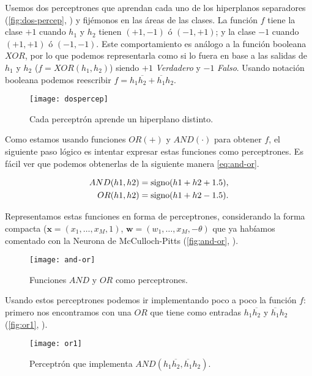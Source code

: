 Usemos dos perceptrones que aprendan cada uno de los hiperplanos separadores (\autoref{fig:dos-percep}, \cite{abu2012learning}) y fijémonos en las áreas de las clases. La función $f$ tiene la clase $+1$ cuando $h_1$ y $h_2$ tienen $(+1, -1)$ ó $(-1, +1)$; y la clase $-1$ cuando $(+1, +1)$ ó $(-1, -1)$. Este comportamiento es análogo a la función booleana $XOR$, por lo que podemos representarla como si lo fuera en base a las salidas de $h_1$ y $h_2$ ($f = XOR(h_1, h_2)$) siendo $+1$ \emph{Verdadero} y $-1$ \emph{Falso}. Usando notación booleana podemos reescribir $f = h_1\overline{h_2} + \overline{h_1}h_2$.

\begin{figure}[htpb]
  \centering
  \texttt{[image: dospercep]}
  \caption{Cada perceptrón aprende un hiperplano distinto.}
  \label{fig:dos-percep}
\end{figure}

Como estamos usando funciones $OR (+)$ y $AND (\cdot)$ para obtener $f$, el siguiente paso lógico es intentar expresar estas funciones como perceptrones. Es fácil ver que podemos obtenerlas de la siguiente manera \eqref{eq:and-or}.

\begin{align}
  AND(h1, h2) = \operatorname{signo}(h1 + h2 + 1.5), \\
  OR(h1, h2) = \operatorname{signo}(h1 + h2 - 1.5). \\
  \label{eq:and-or}
\end{align}

Representamos estas funciones en forma de perceptrones, considerando la forma compacta ($\textbf{x} = (x_1, \ldots, x_M, 1)$, $\textbf{w} = (w_1, \ldots, x_M, -\theta)$ que ya habíamos comentado con la Neurona de McCulloch-Pitts (\autoref{fig:and-or}, \cite{abu2012learning}).

\begin{figure}[htpb]
  \centering
  \texttt{[image: and-or]}
  \caption{Funciones $AND$ y $OR$ como perceptrones.}
  \label{fig:and-or}
\end{figure}

Usando estos perceptrones podemos ir implementando poco a poco la función $f$: primero nos encontramos con una $OR$ que tiene como entradas $h_1\overline{h_2}$ y $\overline{h_1}h_2$ (\autoref{fig:or1}, \cite{abu2012learning}).

\begin{figure}[htpb]
  \centering
  \texttt{[image: or1]}
  \caption{Perceptrón que implementa $AND(h_1\overline{h_2}, \overline{h_1}h_2)$.}
  \label{fig:or1}
\end{figure}

